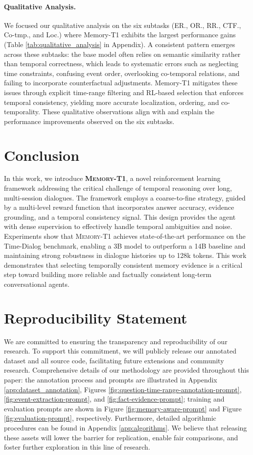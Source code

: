 \documentclass{article} %
\begin{document}
\paragraph{Qualitative Analysis.} We focused our qualitative analysis on the six subtasks (ER., OR., RR., CTF., Co-tmp., and Loc.) where Memory-T1 exhibits the largest performance gains (Table \ref{tab:qualitative_analysis} in Appendix). A consistent pattern emerges across these subtasks: the base model often relies on semantic similarity rather than temporal correctness, which leads to systematic errors such as neglecting time constraints, confusing event order, overlooking co-temporal relations, and failing to incorporate counterfactual adjustments. Memory-T1 mitigates these issues through explicit time-range filtering and RL-based selection that enforces temporal consistency, yielding more accurate localization, ordering, and co-temporality. These qualitative observations align with and explain the performance improvements observed on the six subtasks.

\section{Conclusion}
In this work, we introduce \textsc{\textbf{Memory-T1}}, a novel reinforcement learning framework addressing the critical challenge of temporal reasoning over long, multi-session dialogues. The framework employs a coarse-to-fine strategy, guided by a multi-level reward function that incorporates answer accuracy, evidence grounding, and a temporal consistency signal. This design provides the agent with dense supervision to effectively handle temporal ambiguities and noise. Experiments show that \textsc{Memory-T1} achieves state-of-the-art performance on the Time-Dialog benchmark, enabling a 3B model to outperform a 14B baseline and maintaining strong robustness in dialogue histories up to 128k tokens. This work demonstrates that selecting temporally consistent memory evidence is a critical step toward building more reliable and factually consistent long-term conversational agents.

\section*{Reproducibility Statement}
We are committed to ensuring the transparency and reproducibility of our research. To support this commitment, we will publicly release our annotated dataset and all source code, facilitating future extensions and community research. Comprehensive details of our methodology are provided throughout this paper: the annotation process and prompts are illustrated in Appendix \ref{app:dataset_annotation}, Figures \ref{fig:question-time-range-annotation-prompt}, \ref{fig:event-extraction-prompt}, and \ref{fig:fact-evidence-prompt}; training and evaluation prompts are shown in Figure \ref{fig:memory-aware-prompt} and Figure \ref{fig:evaluation-prompt}, respectively. Furthermore, detailed algorithmic procedures can be found in Appendix \ref{app:algorithms}. We believe that releasing these assets will lower the barrier for replication, enable fair comparisons, and foster further exploration in this line of research.
\end{document}
